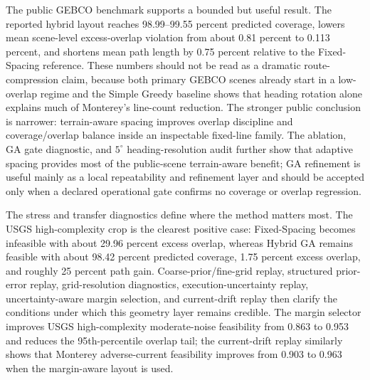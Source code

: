\documentclass[jmse,article,submit,moreauthors]{Definitions/mdpi}
\begin{document}
The public GEBCO benchmark supports a bounded but useful result. The reported hybrid layout reaches 98.99--99.55 percent predicted coverage, lowers mean scene-level excess-overlap violation from about 0.81 percent to 0.113 percent, and shortens mean path length by 0.75 percent relative to the Fixed-Spacing reference. These numbers should not be read as a dramatic route-compression claim, because both primary GEBCO scenes already start in a low-overlap regime and the Simple Greedy baseline shows that heading rotation alone explains much of Monterey's line-count reduction. The stronger public conclusion is narrower: terrain-aware spacing improves overlap discipline and coverage/overlap balance inside an inspectable fixed-line family. The ablation, GA gate diagnostic, and \(5^{\circ}\) heading-resolution audit further show that adaptive spacing provides most of the public-scene terrain-aware benefit; GA refinement is useful mainly as a local repeatability and refinement layer and should be accepted only when a declared operational gate confirms no coverage or overlap regression.

The stress and transfer diagnostics define where the method matters most. The USGS high-complexity crop is the clearest positive case: Fixed-Spacing becomes infeasible with about 29.96 percent excess overlap, whereas Hybrid GA remains feasible with about 98.42 percent predicted coverage, 1.75 percent excess overlap, and roughly 25 percent path gain. Coarse-prior/fine-grid replay, structured prior-error replay, grid-resolution diagnostics, execution-uncertainty replay, uncertainty-aware margin selection, and current-drift replay then clarify the conditions under which this geometry layer remains credible. The margin selector improves USGS high-complexity moderate-noise feasibility from 0.863 to 0.953 and reduces the 95th-percentile overlap tail; the current-drift replay similarly shows that Monterey adverse-current feasibility improves from 0.903 to 0.963 when the margin-aware layout is used.
\end{document}

